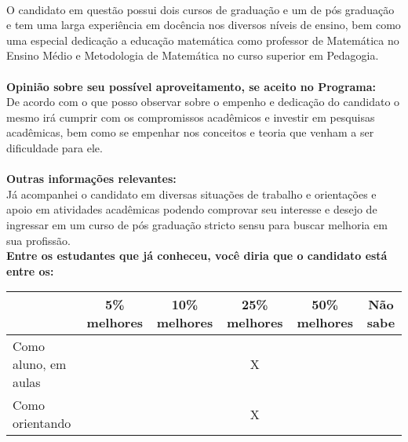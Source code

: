 \documentclass[11pt]{article}
\begin{document}
\\O candidato em questão possui dois cursos de graduação e um de pós graduação e tem uma larga experiência em docência nos diversos níveis de ensino, bem como uma especial dedicação a educação matemática como professor de Matemática no Ensino Médio e Metodologia de Matemática no curso superior em Pedagogia.\\
\\
\textbf{Opinião sobre seu possível aproveitamento, se aceito no Programa:}
\\De acordo com o que posso observar sobre o empenho e dedicação do candidato o mesmo irá cumprir com os compromissos acadêmicos e investir em pesquisas acadêmicas, bem como se empenhar nos conceitos e teoria que venham a ser dificuldade para ele.\\ 
\\
\textbf{Outras informações relevantes:} \\Já acompanhei o candidato em diversas situações de trabalho e orientações e apoio em atividades acadêmicas podendo comprovar seu interesse e desejo de ingressar em um curso de pós graduação stricto sensu para buscar melhoria em sua profissão. 
\\[0.3cm]
\textbf{Entre os estudantes que já conheceu, você diria que o candidato está entre os:}
\\
\begin{tabular}{|l|c|c|c|c|c|}
\hline
 & 5\% melhores & 10\% melhores & 25\% melhores & 50\% melhores & Não sabe \\
\hline
Como aluno, em aulas &  &  & X &  & \\
\hline
Como orientando &  &  & X &  & \\
\hline
\end{tabular}
\end{document}
